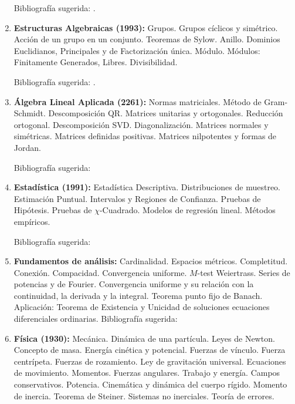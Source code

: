 \documentclass[a4paper, 12pt]{article}
\begin{document}
\begin{enumerate}
Bibliografía sugerida: \cite{berts, parzen, ross, grimmet}. 

\item \textbf{Estructuras Algebraicas  (1993):} Grupos. Grupos cíclicos y
simétrico. Acción de un grupo en un conjunto. Teoremas de Sylow.
Anillo. Dominios Euclidianos, Principales y de Factorización
única. Módulo. Módulos: Finitamente Generados, Libres.
Divisibilidad.

Bibliografía sugerida: \cite{ gentile,herstein, lang}.



\item\textbf{Álgebra Lineal Aplicada (2261):}  Normas matriciales.
Método de Gram-Schmidt. Descomposición QR.
Matrices unitarias y ortogonales. Reducción ortogonal.
Descomposición SVD. Diagonalización. Matrices normales y simétricas. Matrices
definidas positivas. Matrices nilpotentes y formas de Jordan.

 Bibliografía sugerida: \cite{golub,hoffman,meyer, strang}


 \item \textbf{Estadística (1991):} Estadística Descriptiva. Distribuciones de muestreo. Estimación Puntual. Intervalos y Regiones de Confianza. Pruebas de Hipótesis. Pruebas de $\chi$-Cuadrado. Modelos de regresión lineal. Métodos empíricos. 

Bibliografía sugerida: \cite{wasserman, devore, witten, boente, mosche}
 
\item \textbf{Fundamentos de análisis:} Cardinalidad. Espacios métricos. Completitud. Conexión. Compacidad. Convergencia uniforme. $M$-test Weiertrass. Series de potencias y de Fourier. Convergencia uniforme y su relación con la continuidad, la  derivada y la  integral. Teorema punto fijo de Banach. Aplicación: Teorema de Existencia y Unicidad de soluciones ecuaciones diferenciales ordinarias.  
Bibliografía sugerida: \cite{RogerGodement658,StephenAbbott134,Simmons671,MichealOSearcoid674,SatishShirali675,VictorBryant676,J.Dieudonne678,WalterRudin681,NikolaosKatzourakis684,VilmosKomornik685,VicenteMontesinos686}











\item\textbf{Física (1930):} Mecánica. Dinámica de una partícula. Leyes
de Newton. Concepto de masa. Energía cinética y potencial. Fuerzas
de vínculo. Fuerza centrípeta. Fuerzas de rozamiento. Ley de
gravitación universal. Ecuaciones de movimiento. Momentos. Fuerzas
angulares. Trabajo y energía. Campos conservativos.
Potencia. Cinemática y  dinámica del cuerpo rígido. Momento de
inercia. Teorema de Steiner. Sistemas no inerciales. Teoría de
errores.


\end{enumerate}
\end{document}
